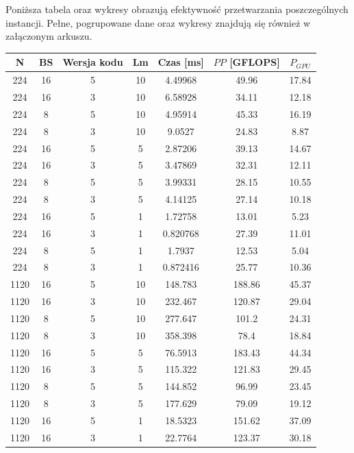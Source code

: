 \documentclass[12pt,a4paper]{article}
\begin{document}
Poniższa tabela oraz wykresy obrazują efektywność przetwarzania poszczególnych instancji. Pełne, pogrupowane dane oraz wykresy znajdują się również w załączonym arkuszu.

\begin{table}[H]
\centering
\def\arraystretch{1.05}
\begin{adjustbox}{totalheight=\textheight-\baselineskip}
\begin{tabular}{|c|c|c|c|c|c|c|}
\hline
N	&	BS	&	Wersja kodu	&	Lm	&	Czas [ms]	&	$PP$ [GFLOPS]	&	$P_{GPU}$	\\ \hline
224	&	16	&	5	&	10	&	4.49968	&	49.96	&	17.84	\\ \hline
224	&	16	&	3	&	10	&	6.58928	&	34.11	&	12.18	\\ \hline
224	&	8	&	5	&	10	&	4.95914	&	45.33	&	16.19	\\ \hline
224	&	8	&	3	&	10	&	9.0527	&	24.83	&	8.87	\\ \hline
224	&	16	&	5	&	5	&	2.87206	&	39.13	&	14.67	\\ \hline
224	&	16	&	3	&	5	&	3.47869	&	32.31	&	12.11	\\ \hline
224	&	8	&	5	&	5	&	3.99331	&	28.15	&	10.55	\\ \hline
224	&	8	&	3	&	5	&	4.14125	&	27.14	&	10.18	\\ \hline
224	&	16	&	5	&	1	&	1.72758	&	13.01	&	5.23	\\ \hline
224	&	16	&	3	&	1	&	0.820768	&	27.39	&	11.01	\\ \hline
224	&	8	&	5	&	1	&	1.7937	&	12.53	&	5.04	\\ \hline
224	&	8	&	3	&	1	&	0.872416	&	25.77	&	10.36	\\ \hline
1120	&	16	&	5	&	10	&	148.783	&	188.86	&	45.37	\\ \hline
1120	&	16	&	3	&	10	&	232.467	&	120.87	&	29.04	\\ \hline
1120	&	8	&	5	&	10	&	277.647	&	101.2	&	24.31	\\ \hline
1120	&	8	&	3	&	10	&	358.398	&	78.4	&	18.84	\\ \hline
1120	&	16	&	5	&	5	&	76.5913	&	183.43	&	44.34	\\ \hline
1120	&	16	&	3	&	5	&	115.322	&	121.83	&	29.45	\\ \hline
1120	&	8	&	5	&	5	&	144.852	&	96.99	&	23.45	\\ \hline
1120	&	8	&	3	&	5	&	177.629	&	79.09	&	19.12	\\ \hline
1120	&	16	&	5	&	1	&	18.5323	&	151.62	&	37.09	\\ \hline
1120	&	16	&	3	&	1	&	22.7764	&	123.37	&	30.18	\\ \hline

\end{tabular}
\end{adjustbox}
\end{table}
\end{document}
